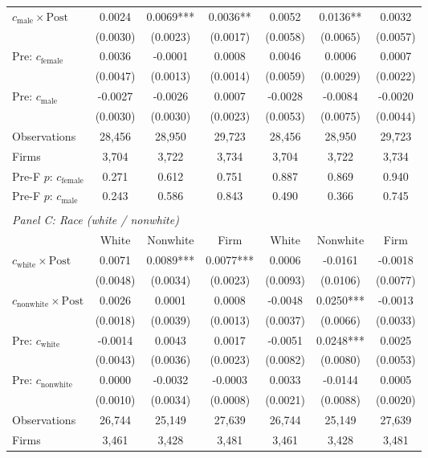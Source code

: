 \begin{table}[H]
{\begin{tabular}{lcccccc}
$c_{\text{male}} \times \text{Post}$ & 0.0024 & 0.0069*** & 0.0036** & 0.0052 & 0.0136** & 0.0032 \\
 & (0.0030) & (0.0023) & (0.0017) & (0.0058) & (0.0065) & (0.0057) \\
Pre: $c_{\text{female}}$ & 0.0036 & -0.0001 & 0.0008 & 0.0046 & 0.0006 & 0.0007 \\
 & (0.0047) & (0.0013) & (0.0014) & (0.0059) & (0.0029) & (0.0022) \\
Pre: $c_{\text{male}}$ & -0.0027 & -0.0026 & 0.0007 & -0.0028 & -0.0084 & -0.0020 \\
 & (0.0030) & (0.0030) & (0.0023) & (0.0053) & (0.0075) & (0.0044) \\
Observations & 28,456 & 28,950 & 29,723 & 28,456 & 28,950 & 29,723 \\
Firms & 3,704 & 3,722 & 3,734 & 3,704 & 3,722 & 3,734 \\
Pre-F $p$: $c_{\text{female}}$ & 0.271 & 0.612 & 0.751 & 0.887 & 0.869 & 0.940 \\
Pre-F $p$: $c_{\text{male}}$ & 0.243 & 0.586 & 0.843 & 0.490 & 0.366 & 0.745 \\
\\[4pt]
\multicolumn{7}{l}{\textit{Panel C: Race (white / nonwhite)}} \\
 & White & Nonwhite & Firm & White & Nonwhite & Firm \\
$c_{\text{white}} \times \text{Post}$ & 0.0071 & 0.0089*** & 0.0077*** & 0.0006 & -0.0161 & -0.0018 \\
 & (0.0048) & (0.0034) & (0.0023) & (0.0093) & (0.0106) & (0.0077) \\
$c_{\text{nonwhite}} \times \text{Post}$ & 0.0026 & 0.0001 & 0.0008 & -0.0048 & 0.0250*** & -0.0013 \\
 & (0.0018) & (0.0039) & (0.0013) & (0.0037) & (0.0066) & (0.0033) \\
Pre: $c_{\text{white}}$ & -0.0014 & 0.0043 & 0.0017 & -0.0051 & 0.0248*** & 0.0025 \\
 & (0.0043) & (0.0036) & (0.0023) & (0.0082) & (0.0080) & (0.0053) \\
Pre: $c_{\text{nonwhite}}$ & 0.0000 & -0.0032 & -0.0003 & 0.0033 & -0.0144 & 0.0005 \\
 & (0.0010) & (0.0034) & (0.0008) & (0.0021) & (0.0088) & (0.0020) \\
Observations & 26,744 & 25,149 & 27,639 & 26,744 & 25,149 & 27,639 \\
Firms & 3,461 & 3,428 & 3,481 & 3,461 & 3,428 & 3,481 \\

\end{tabular}}
\end{table}

